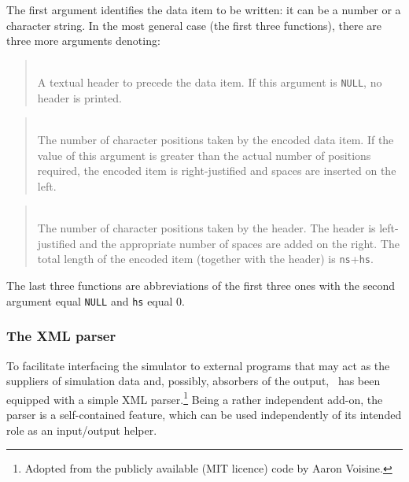 The first argument identifies the data item to be written: it can be a
number or a character string.
In the most general case (the first three functions), there are three more
arguments denoting:

\medskip

\begin{quote}
\noindent{}\\ \hspace{0in}
A textual header to precede the data item.
If this argument is {\tt NULL}, no header is printed.
\end{quote}

\begin{quote}
\noindent{}\\ \hspace{0in}
The number of character positions taken by the encoded data item.
If the value of this argument is greater than the actual number of positions
required, the encoded item is right-justified and spaces are inserted on the
left.
\end{quote}

\begin{quote}
\noindent{}\\ \hspace{0in}
The number of character positions taken by the header.
The header is left-justified and the appropriate number of spaces are added
on the right.
The total length of the encoded item (together with the header) is
{\tt ns}+{\tt hs}.
\end{quote}\medskip

The last three functions are abbreviations of the first three ones with
the second argument equal {\tt NULL} and {\tt hs} equal 0.

\subsubsection{The XML parser}
\label{rm_au_io_xm}

To facilitate interfacing the simulator to external programs that may act as
the suppliers of simulation data and, possibly, absorbers of the output, 
\smurph\ has been equipped with a simple XML
parser.\footnote{Adopted from the publicly available (MIT licence)
code by Aaron Voisine.}
Being a rather independent add-on,
the parser is a self-contained feature, which can be used
independently of its intended role as an input/output helper.

